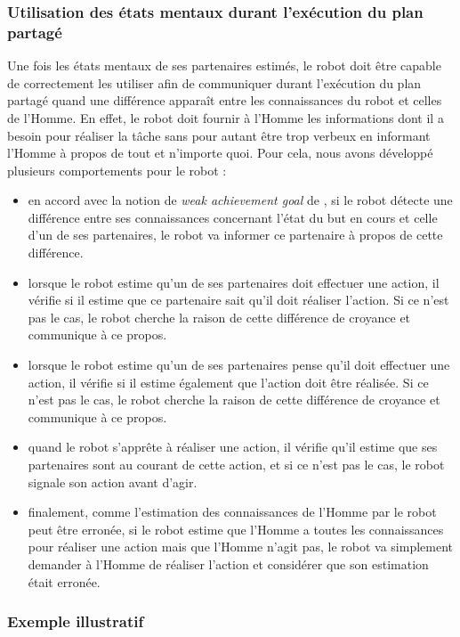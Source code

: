 \documentclass[english,a4paper,11pt,twoside]{StyleThese}
\begin{document}
\subsubsection{Utilisation des états mentaux durant l'exécution du plan partagé}

Une fois les états mentaux de ses partenaires estimés, le robot doit être capable de correctement les utiliser afin de communiquer durant l'exécution du plan partagé quand une différence apparaît entre les connaissances du robot et celles de l'Homme. En effet, le robot doit fournir à l'Homme les informations dont il a besoin pour réaliser la tâche sans pour autant être trop verbeux en informant l'Homme à propos de tout et n'importe quoi. Pour cela, nous avons développé plusieurs comportements pour le robot :
\begin{itemize}
\item en accord avec la notion de \textit{weak achievement goal} de \cite{cohen1991teamwork}, si le robot détecte une différence entre ses connaissances concernant l'état du but en cours et celle d'un de ses partenaires, le robot va informer ce partenaire à propos de cette différence.
\item  lorsque le robot estime qu'un de ses partenaires doit effectuer une action, il vérifie si il estime que ce partenaire sait qu'il doit réaliser l'action. Si ce n'est pas le cas, le robot cherche la raison de cette différence de croyance et communique à ce propos.
\item lorsque le robot estime qu'un de ses partenaires pense qu'il doit effectuer une action, il vérifie si il estime également que l'action doit être réalisée. Si ce n'est pas le cas, le robot cherche la raison de cette différence de croyance et communique à ce propos.
\item quand le robot s’apprête à réaliser une action, il vérifie qu'il estime que ses partenaires sont au courant de cette action, et si ce n'est pas le cas, le robot signale son action avant d'agir.
\item finalement, comme l'estimation des connaissances de l'Homme par le robot peut être erronée, si le robot estime que l'Homme a toutes les connaissances pour réaliser une action mais que l'Homme n'agit pas, le robot va simplement demander à l'Homme de réaliser l'action et considérer que son estimation était erronée.
\end{itemize}

\subsubsection{Exemple illustratif}
\end{document}
